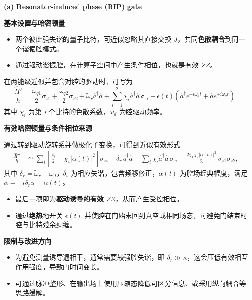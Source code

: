 \documentclass[12pt,a4paper,oneside]{ctexbook}
\begin{document}
\noindent\textbf{(a) Resonator-induced phase (RIP) gate}

\noindent\textbf{基本设置与哈密顿量}

\begin{itemize}
  \item 两个彼此强失谐的量子比特，可近似忽略其直接交换 $J$，共同\textbf{色散耦合}到同一个谐振腔模式。
  \item 通过驱动谐振腔，在计算子空间中产生条件相位，也就是有效 $ZZ$。
\end{itemize}

在两能级近似并包含对腔的驱动时，可写为
\begin{equation}
  \frac{\hat H'}{\hbar}
  =
  \frac{\tilde\omega_{q1}}{2}\sigma_{z1}
  +\frac{\tilde\omega_{q2}}{2}\sigma_{z2}
  +\tilde\omega_r \hat a^\dagger\hat a
  +\sum_{i=1}^{2}\chi_i \hat a^\dagger\hat a\,\sigma_{zi}
  +\epsilon(t)\!\left(\hat a^\dagger e^{-i\omega_d t}+\hat a e^{+i\omega_d t}\right),
  \tag{141}
\end{equation}
其中 $\chi_i$ 为第 $i$ 个比特的色散系数，$\omega_d$ 为腔驱动频率。

\noindent\textbf{有效哈密顿量与条件相位来源}

通过转到驱动旋转系并做极化子变换，可得到近似有效形式
\begin{align}
  \frac{\hat H''}{\hbar}
  &\simeq
  \sum_i\left[\frac{\tilde\delta_i}{2}+\chi_i|\alpha(t)|^2\right]\sigma_{zi}
  +\delta_r\,\hat a^\dagger\hat a
  +\sum_i \chi_i \hat a^\dagger\hat a\,\sigma_{zi}
  -\frac{2\chi_1\chi_2|\alpha(t)|^2}{\delta_r}\,\sigma_{z1}\sigma_{z2},
  \tag{142}
\end{align}
其中 $\delta_r=\tilde\omega_r-\omega_d$，$\tilde\delta_i$ 为相应失谐，包含频移修正，$\alpha(t)$ 为腔场经典幅度，满足 $\dot\alpha=-i\delta_r\alpha-i\epsilon(t)$。
\begin{itemize}
  \item 最后一项即为\textbf{驱动诱导的有效 $ZZ$}，从而产生受控相位。
  \item 通过\textbf{绝热}地开关 $\epsilon(t)$ 并使腔在门始末回到真空或相同场态，可避免门结束时腔与比特残余纠缠。
\end{itemize}

\noindent\textbf{限制与改进方向}

\begin{itemize}
  \item 为避免测量诱导退相干，通常需要较强腔失谐，即 $\delta_r\gg\kappa$，这会压低有效相互作用强度，导致门时间变长。
  \item 可通过脉冲整形、在输出场上使用压缩态降低可区分信息、或采用纵向耦合等思路缓解。
\end{itemize}
\end{document}
